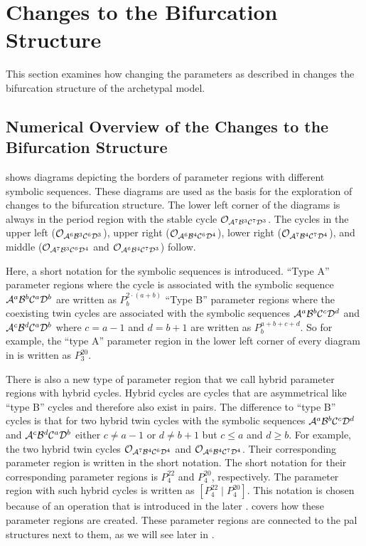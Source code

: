 \section{Changes to the Bifurcation Structure}
\label{sec:add.change}

This section examines how changing the parameters as described in  changes the bifurcation structure of the archetypal model.

\subsection{Numerical Overview of the Changes to the Bifurcation Structure}
\label{sec:add.change.num}

 shows diagrams depicting the borders of parameter regions with different symbolic sequences.
These diagrams are used as the basis for the exploration of changes to the bifurcation structure.
The lower left corner of the diagrams is always in the period region with the stable cycle $\mathcal{O}_{\mathcal{A}^7\mathcal{B}^3\mathcal{C}^7\mathcal{D}^3}$.
The cycles in the upper left ($\mathcal{O}_{\mathcal{A}^6\mathcal{B}^3\mathcal{C}^6\mathcal{D}^3}$), upper right ($\mathcal{O}_{\mathcal{A}^6\mathcal{B}^4\mathcal{C}^6\mathcal{D}^4}$), lower right ($\mathcal{O}_{\mathcal{A}^7\mathcal{B}^4\mathcal{C}^7\mathcal{D}^4}$), and middle ($\mathcal{O}_{\mathcal{A}^7\mathcal{B}^3\mathcal{C}^6\mathcal{D}^4}$ and $\mathcal{O}_{\mathcal{A}^6\mathcal{B}^4\mathcal{C}^7\mathcal{D}^3}$) follow.

Here, a short notation for the symbolic sequences is introduced.
``Type A'' parameter regions where the cycle is associated with the symbolic sequence $\mathcal{A}^a\mathcal{B}^b\mathcal{C}^a\mathcal{D}^b$ are written as $P^{2 \cdot \left(a + b\right)}_b$
``Type B'' parameter regions where the coexisting twin cycles are associated with the symbolic sequences $\mathcal{A}^a\mathcal{B}^b\mathcal{C}^c\mathcal{D}^d$ and $\mathcal{A}^c\mathcal{B}^d\mathcal{C}^a\mathcal{D}^b$ where $c = a - 1$ and $d = b + 1$ are written as $P^{a + b + c + d}_b$.
So for example, the ``type A'' parameter region in the lower left corner of every diagram in  is written as $P^{20}_3$.

There is also a new type of parameter region that we call hybrid parameter regions with hybrid cycles.
Hybrid cycles are cycles that are asymmetrical like ``type B'' cycles and therefore also exist in pairs.
The difference to ``type B'' cycles is that for two hybrid twin cycles with the symbolic sequences $\mathcal{A}^a\mathcal{B}^b\mathcal{C}^c\mathcal{D}^d$ and $\mathcal{A}^c\mathcal{B}^d\mathcal{C}^a\mathcal{D}^b$ either $c \neq a - 1$ or $d \neq b + 1$ but $c \leq a$ and $d \geq b$.
For example, the two hybrid twin cycles $\mathcal{O}_{\mathcal{A}^7\mathcal{B}^4\mathcal{C}^6\mathcal{D}^4}$ and $\mathcal{O}_{\mathcal{A}^6\mathcal{B}^4\mathcal{C}^7\mathcal{D}^4}$.
Their corresponding parameter region is written  in the short notation.
The short notation for their corresponding parameter regions is $P^{22}_4$ and $P^{20}_4$, respectively.
The parameter region with such hybrid cycles is written as $\left[P^{22}_4 \mid P^{20}_4\right]$.
This notation is chosen because of an operation that is introduced in the later .
 covers how these parameter regions are created.
These parameter regions are connected to the \gls{pal} structures next to them, as we will see later in .

